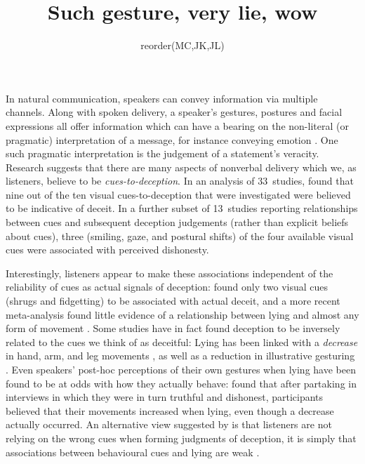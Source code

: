 \documentclass[a4paper,man,natbib]{apa6}
\title{Such gesture, very lie, wow}
\author{reorder(MC,JK,JL)}
\affiliation{Psychology, PPLS, University of Edinburgh}
\newcommand*{\term}[1]{\emph{#1}} %
\begin{document}
\maketitle
\linenumbers
\noindent
In natural communication, speakers can convey information via multiple channels.
Along with spoken delivery, a speaker's gestures, postures and facial expressions all offer information which can have a bearing on the non-literal (or pragmatic) interpretation of a message, for instance conveying emotion \citep{Busso2004, Gregersen2005}.
One such pragmatic interpretation is the judgement of a statement's veracity.
Research suggests that there are many aspects of nonverbal delivery which we, as listeners, believe to be \term{cues-to-deception}. 
In an analysis of 33~studies, \citet{Zuckerman1981} found that nine out of the ten visual cues-to-deception that were investigated were believed to be indicative of deceit. 
In a further subset of 13~studies reporting relationships between cues and subsequent deception judgements (rather than explicit beliefs about cues), three (smiling, gaze, and postural shifts) of the four available visual cues were associated with perceived dishonesty.

Interestingly, listeners appear to make these associations independent of the reliability of cues as actual signals of deception: \citet{Zuckerman1981} found only two visual cues (shrugs and fidgetting) to be associated with actual deceit, and a more recent meta-analysis found little evidence of a relationship between lying and almost any form of movement \citep{DePaulo2003}.
Some studies have in fact found deception to be inversely related to the cues we think of as deceitful:
Lying has been linked with a \emph{decrease} in hand, arm, and leg movements \citep[e.g.][]{DePaulo1992, Ekman1989, Vrij1995}, as well as a reduction in illustrative gesturing \citep[e.g.][]{DePaulo2003, Cohen2010}.
Even speakers' post-hoc perceptions of their own gestures when lying have been found to be at odds with how they actually behave:
\citet{Vrij1996} found that after partaking in interviews in which they were in turn truthful and dishonest, participants believed that their movements increased when lying, even though a decrease actually occurred.
An alternative view suggested by \citet{Hartwig2011} is that listeners are not relying on the wrong cues when forming judgments of deception, it is simply that associations between behavioural cues and lying are weak \citep{Hartwig2011}.
\end{document}
